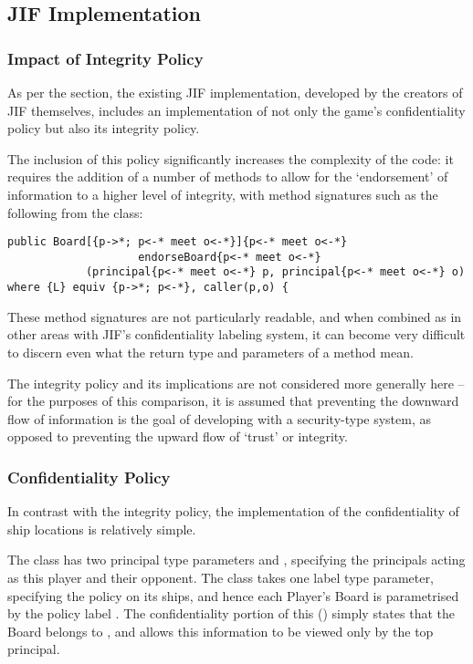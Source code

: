 \newpage

\subsection{JIF Implementation}

\subsubsection{Impact of Integrity Policy}

As per the  section, the existing JIF implementation, developed by the creators of JIF themselves, includes an implementation of not only the game's confidentiality policy but also its integrity policy.

The inclusion of this policy significantly increases the complexity of the code: it requires the addition of a number of methods to allow for the `endorsement' of information to a higher level of integrity, with method signatures such as the following from the  class:

\begin{verbatim}
public Board[{p->*; p<-* meet o<-*}]{p<-* meet o<-*} 
					endorseBoard{p<-* meet o<-*}
			(principal{p<-* meet o<-*} p, principal{p<-* meet o<-*} o)
where {L} equiv {p->*; p<-*}, caller(p,o) {
\end{verbatim}

These method signatures are not particularly readable, and when combined as in other areas with JIF's confidentiality labeling system, it can become very difficult to discern even what the return type and parameters of a method mean.

The integrity policy and its implications are not considered more generally here -- for the purposes of this comparison, it is assumed that preventing the downward flow of information is the goal of developing with a security-type system, as opposed to preventing the upward flow of `trust' or integrity.

\subsubsection{Confidentiality Policy}

In contrast with the integrity policy, the implementation of the confidentiality of ship locations is relatively simple.

 The  class has two principal type parameters  and , specifying the principals acting as this player and their opponent. The  class takes one label type parameter, specifying the policy on its ships, and hence each Player's Board is parametrised by the policy label . The confidentiality portion of this () simply states that the Board belongs to , and  allows this information to be viewed only by the top principal.
 

